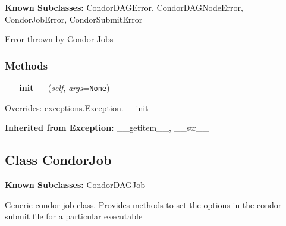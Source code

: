 \textbf{Known Subclasses:}
CondorDAGError,
    CondorDAGNodeError,
    CondorJobError,
    CondorSubmitError

Error thrown by Condor Jobs



  \subsubsection{Methods}

    \label{pipeline:CondorError:__init__}
    \vspace{0.5ex}

    \noindent\begin{boxedminipage}{\textwidth}

    \raggedright \textbf{\_\_init\_\_}(\textit{self}, \textit{args}=\texttt{N\-o\-n\-e\-})

      Overrides: exceptions.Exception.\_\_init\_\_

    \end{boxedminipage}

  \noindent\textbf{Inherited from Exception:}
    \_\_getitem\_\_,
    \_\_str\_\_


\subsection{Class CondorJob}

    \label{pipeline:CondorJob}
\textbf{Known Subclasses:} CondorDAGJob

Generic condor job class. Provides methods to set the options in the 
condor submit file for a particular executable



